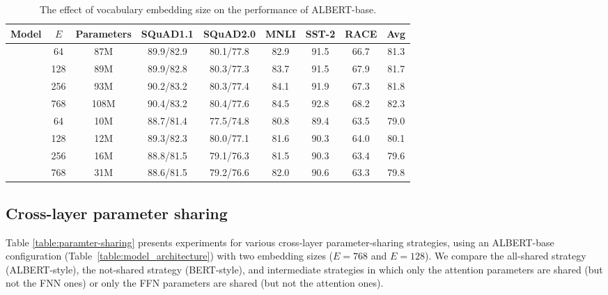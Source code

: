 \begin{table}[!htbp] 
\small
\centering
\begin{tabular}{ c c c | c c c c c | c }
Model  & $E$ & Parameters     	&SQuAD1.1	&SQuAD2.0	&MNLI	&SST-2	&RACE	&Avg \\
\hline
{}
& 64  & 87M &89.9/82.9	&80.1/77.8	&82.9	&91.5	&66.7   &81.3 \\
& 128 & 89M &89.9/82.8	&80.3/77.3	&83.7	&91.5	&67.9	&81.7 \\
& 256 & 93M &90.2/83.2	&80.3/77.4	&84.1	&91.9	&67.3	&81.8 \\
& 768 & 108M &90.4/83.2	&80.4/77.6	&84.5	&92.8	&68.2	&82.3  \\
\hline
{}
&64     & 10M &88.7/81.4	&77.5/74.8  &80.8	&89.4	&63.5	&79.0 \\
&128    & 12M  &89.3/82.3	&80.0/77.1	&81.6	&90.3	&64.0	&80.1 \\
&256    & 16M &88.8/81.5	&79.1/76.3	&81.5	&90.3	&63.4	&79.6 \\
&768    & 31M &88.6/81.5	&79.2/76.6	&82.0	&90.6	&63.3	&79.8 \\
\end{tabular}
\caption{The effect of vocabulary embedding size on the performance of ALBERT-base.}
\label{table:voc_embedding}
\end{table}


\vspace{-3pt}

\subsection{Cross-layer parameter sharing}
\label{sec:sharing}
Table \ref{table:paramter-sharing} presents experiments for various cross-layer parameter-sharing strategies, using an ALBERT-base configuration (Table~\ref{table:model_architecture}) with two embedding sizes ($E=768$ and $E=128$).
We compare the all-shared strategy (ALBERT-style), the not-shared strategy (BERT-style), and intermediate strategies in which only the attention parameters are shared (but not the FNN ones) or only the FFN parameters are shared (but not the attention ones).

